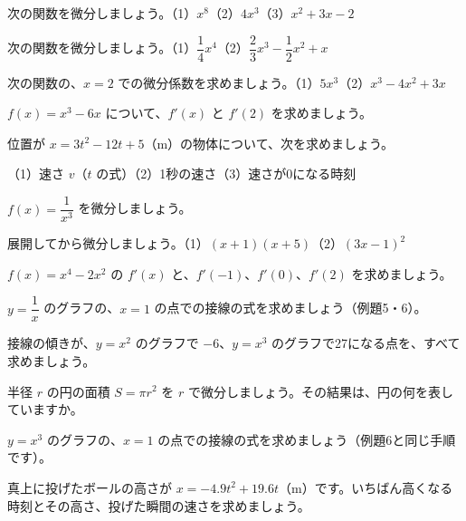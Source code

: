 \bkproblem 次の関数を微分しましょう。\quad（1）$x^8$\quad（2）$4x^3$\quad（3）$x^2+3x-2$

\bkproblem 次の関数を微分しましょう。\quad（1）$\dfrac{1}{4}x^4$\quad（2）$\dfrac{2}{3}x^3-\dfrac{1}{2}x^2+x$

\bkproblem 次の関数の、$x=2$ での微分係数を求めましょう。\quad（1）$5x^3$\quad（2）$x^3-4x^2+3x$

\bkproblem $f(x)=x^3-6x$ について、$f'(x)$ と $f'(2)$ を求めましょう。

\bkproblem 位置が $x=3t^2-12t+5$（m）の物体について、次を求めましょう。\par
（1）速さ $v$（$t$ の式）\quad（2）1秒の速さ\quad（3）速さが0になる時刻

\bkproblem $f(x)=\dfrac{1}{x^3}$ を微分しましょう。

\bkproblem 展開してから微分しましょう。\quad（1）$(x+1)(x+5)$\quad（2）$(3x-1)^2$

\bkproblem $f(x)=x^4-2x^2$ の $f'(x)$ と、$f'(-1)$、$f'(0)$、$f'(2)$ を求めましょう。

\bkproblem $y=\dfrac{1}{x}$ のグラフの、$x=1$ の点での接線の式を求めましょう（例題5・6）。

\bkproblem 接線の傾きが、$y=x^2$ のグラフで $-6$、$y=x^3$ のグラフで27になる点を、すべて求めましょう。


\bkproblem 半径 $r$ の円の面積 $S=\pi r^2$ を $r$ で微分しましょう。その結果は、円の何を表していますか。

\bkproblem $y=x^3$ のグラフの、$x=1$ の点での接線の式を求めましょう（例題6と同じ手順です）。

\bkproblem 真上に投げたボールの高さが $x=-4.9t^2+19.6t$（m）です。いちばん高くなる時刻とその高さ、投げた瞬間の速さを求めましょう。

